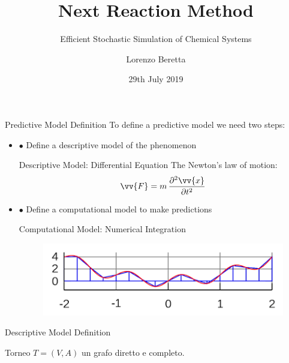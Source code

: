 \documentclass{beamer}
\title{Next Reaction Method}
\subtitle{Efficient Stochastic Simulation of Chemical Systems}
\author{Lorenzo Beretta}
\date{29th July 2019}
\begin{document}
\begin{frame}
  \maketitle
\end{frame}

\begin{frame}{Predictive Model Definition}
  To define a predictive model we need two steps:
  \begin{itemize}
  \item $\bullet$ Define a descriptive model of the phenomenon
    \begin{block}{Descriptive Model: Differential Equation}
      The Newton's law of motion:
      $$ \vv{F} = m \, \frac{\partial^2 \vv{x}}{\partial t^2} $$
    \end{block}
    
  \item $\bullet$ Define a computational model to make predictions
    \begin{block}{Computational Model: Numerical Integration}
      \begin{figure}[h]
        \centering
        \includegraphics[scale=0.6]{num_int}
      \end{figure}

    \end{block}

  \end{itemize}
\end{frame}

\begin{frame}{Descriptive Model Definition}
	\begin{block}{Torneo}
	$T=\left(V,A\right)$ un grafo diretto e completo.
	\end{block}
	\begin{center}
	\end{center}
\end{frame}
\end{document}
